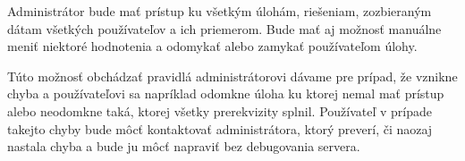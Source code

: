 Administrátor bude mať prístup ku všetkým úlohám, riešeniam, zozbieraným dátam všetkých používateľov
a ich priemerom. Bude mať aj možnosť manuálne meniť niektoré hodnotenia a odomykať alebo zamykať používateľom úlohy.

Túto možnosť obchádzať pravidlá administrátorovi dávame pre prípad, že vznikne chyba a
používateľovi sa napríklad odomkne úloha ku ktorej nemal mať prístup alebo neodomkne taká,
ktorej všetky prerekvizity splnil. Používateľ v prípade takejto chyby bude môcť kontaktovať
administrátora, ktorý preverí, či naozaj nastala chyba a bude ju môcť napraviť bez debugovania servera.

